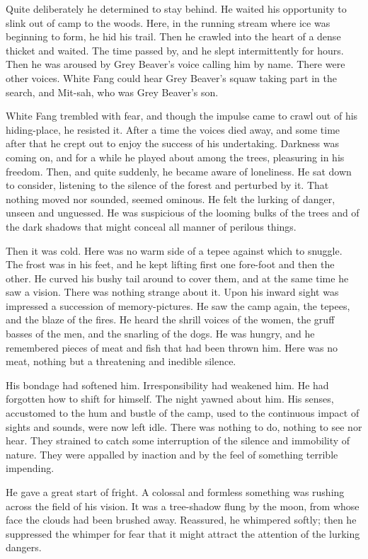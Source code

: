 \documentclass[10pt]{book}
\begin{document}
Quite deliberately he determined to stay behind. He waited his
opportunity to slink out of camp to the woods. Here, in the running
stream where ice was beginning to form, he hid his trail. Then he
crawled into the heart of a dense thicket and waited. The time passed
by, and he slept intermittently for hours. Then he was aroused by Grey
Beaver’s voice calling him by name. There were other voices. White Fang
could hear Grey Beaver’s squaw taking part in the search, and Mit-sah,
who was Grey Beaver’s son.

White Fang trembled with fear, and though the impulse came to crawl out
of his hiding-place, he resisted it. After a time the voices died away,
and some time after that he crept out to enjoy the success of his
undertaking. Darkness was coming on, and for a while he played about
among the trees, pleasuring in his freedom. Then, and quite suddenly,
he became aware of loneliness. He sat down to consider, listening to
the silence of the forest and perturbed by it. That nothing moved nor
sounded, seemed ominous. He felt the lurking of danger, unseen and
unguessed. He was suspicious of the looming bulks of the trees and of
the dark shadows that might conceal all manner of perilous things.

Then it was cold. Here was no warm side of a tepee against which to
snuggle. The frost was in his feet, and he kept lifting first one
fore-foot and then the other. He curved his bushy tail around to cover
them, and at the same time he saw a vision. There was nothing strange
about it. Upon his inward sight was impressed a succession of
memory-pictures. He saw the camp again, the tepees, and the blaze of
the fires. He heard the shrill voices of the women, the gruff basses of
the men, and the snarling of the dogs. He was hungry, and he remembered
pieces of meat and fish that had been thrown him. Here was no meat,
nothing but a threatening and inedible silence.

His bondage had softened him. Irresponsibility had weakened him. He had
forgotten how to shift for himself. The night yawned about him. His
senses, accustomed to the hum and bustle of the camp, used to the
continuous impact of sights and sounds, were now left idle. There was
nothing to do, nothing to see nor hear. They strained to catch some
interruption of the silence and immobility of nature. They were
appalled by inaction and by the feel of something terrible impending.

He gave a great start of fright. A colossal and formless something was
rushing across the field of his vision. It was a tree-shadow flung by
the moon, from whose face the clouds had been brushed away. Reassured,
he whimpered softly; then he suppressed the whimper for fear that it
might attract the attention of the lurking dangers.
\end{document}
